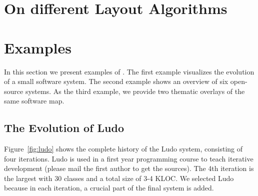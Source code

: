 \section{On different Layout Algorithms}


\section{Examples}

In this section we present examples of \SOCA. The first example visualizes the evolution of a small software system. The second example shows an overview of six open-source systems. As the third example, we provide two thematic overlays of the same software map.

\subsection{The Evolution of Ludo}

Figure~\ref{fig:ludo} shows the complete history of the Ludo system, consisting of four iterations. Ludo is used in a first year programming course to teach iterative development (please mail the first author to get the sources). The 4th iteration is the largest with 30 classes and a total size of 3-4 KLOC. We selected Ludo because in each iteration, a crucial part of the final system is added. 

